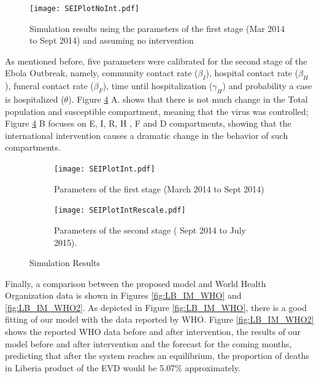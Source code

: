 \begin{figure}[!h]
  \centering
  \texttt{[image: SEIPlotNoInt.pdf]}
  \caption{Simulation results using the parameters of the first stage (Mar 2014  to Sept 2014) and assuming no intervention}
\label{fig:LB_IM_NoIn} 
\end{figure}

\noindent As mentioned before, five parameters were calibrated for the second stage of the Ebola Outbreak, namely, community contact rate ($\beta_I$), hospital contact rate ($\beta_H$), funeral contact rate ($\beta_F$), time until hospitalization ($\gamma_H$) and probability a case is hospitalized ($\theta$). Figure \ref{fig:LB_IM_In} A. shows that there is not much change in the Total population and susceptible compartment, meaning that the virus was controlled;  Figure \ref{fig:LB_IM_In} B focuses on E, I, R, H , F and D compartments, showing that the international intervention causes a dramatic change in the behavior of such compartments.


\begin{figure}[h!]
 \centering 
 \begin{subfigure}[b]{1\textwidth}
  \texttt{[image: SEIPlotInt.pdf]} \caption{ Parameters of the first stage (March 2014  to Sept 2014)} \label{fig:LB_IM_In1} \end{subfigure}
 \hspace{.1cm}
\begin{subfigure}[b]{1\textwidth}
 \texttt{[image: SEIPlotIntRescale.pdf]} \caption{ Parameters of the second stage ( Sept 2014 to July 2015).} \label{fig:LB_IM_In2} \end{subfigure} \caption{Simulation Results}
\label{fig:LB_IM_In} 
\end{figure}






\noindent Finally, a comparison between the proposed model and World Health Organization data is shown in Figures \ref{fig:LB_IM_WHO} and \ref{fig:LB_IM_WHO2}. As depicted in Figure \ref{fig:LB_IM_WHO}, there is a good fitting of our model with the data reported by WHO. Figure \ref{fig:LB_IM_WHO2} shows  the reported WHO data before and after intervention, the results of our model before and after intervention and the forecast for the coming months, predicting that after the system reaches an equilibrium, the proportion of deaths in Liberia product of the EVD would be 5.07\% approximately.



